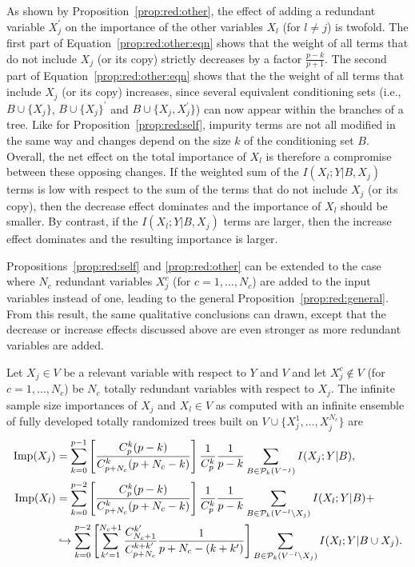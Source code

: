 As shown by Proposition~\ref{prop:red:other}, the effect of adding a redundant
variable $X_j^\prime$ on the importance of the other variables $X_l$ (for
$l\neq j$) is twofold. The first part of Equation~\ref{prop:red:other:eqn}
shows that the weight of all terms that do not include $X_j$ (or its copy)
strictly decreases by a factor $\tfrac{p-k}{p+1}$. The second part of
Equation~\ref{prop:red:other:eqn} shows that the the weight of all terms that
include $X_j$ (or its copy) increases, since several equivalent conditioning
sets (i.e., $B\cup \{X_j\}$, $B\cup \{X_j\}^\prime$ and $B\cup \{X_j,
X_j^\prime\}$) can now appear within the branches of a tree. Like for
Proposition~\ref{prop:red:self}, impurity terms are not all modified in the
same way and changes depend on the size $k$ of the conditioning set $B$.
Overall, the net effect on the total importance of $X_l$ is therefore a
compromise between these opposing changes. If the weighted sum of the
$I(X_l;Y|B,X_j)$ terms is low with respect to the sum of the terms that do not
include $X_j$ (or its copy), then the decrease effect dominates and the
importance of $X_l$ should be smaller. By contrast, if the $I(X_l;Y|B,X_j)$
terms are larger, then the increase effect dominates and the resulting
importance is larger.

Propositions~\ref{prop:red:self} and \ref{prop:red:other} can be extended to
the case where $N_c$ redundant variables $X_j^c$ (for $c=1,\dots,N_c$) are
added to the input variables instead of one, leading to the general
Proposition~\ref{prop:red:general}. From this result, the same qualitative
conclusions can drawn, except that the decrease or increase effects discussed
above are even stronger as more redundant variables are added.

\begin{proposition}\label{prop:red:general}
Let $X_j\in V$ be a relevant variable with respect to $Y$ and $V$ and let
$X_j^c \notin V$ (for $c=1,\dots,N_c$) be $N_c$ totally redundant variables with respect to $X_j$.
The infinite sample size importances of $X_j$ and $X_l \in V$ as computed with an infinite
ensemble of fully developed totally randomized trees built on $V\cup
\{X_j^1,\dots,X_j^{N_c}\}$ are
\begin{align*}
\text{Imp}(X_j)  &= \sum_{k=0}^{p-1} \left[ \frac{C^k_p (p-k)}{C^k_{p+N_c}(p+N_c-k)}  \right] \frac{1}{C_p^k} \frac{1}{p-k} \sum_{B \in {\cal P}_k(V^{-j})} I(X_j;Y|B), \\
\text{Imp}(X_l) &= \sum_{k=0}^{p-2} \left[ \frac{C^k_p (p-k)}{C^k_{p+N_c}(p+N_c-k)}  \right] \frac{1}{C_p^k} \frac{1}{p-k} \sum_{B \in {\cal P}_k(V^{-l} \setminus X_j)} I(X_l;Y|B) + \\
                & \hookrightarrow \sum_{k=0}^{p-2}  \left[ \sum_{k'=1}^{N_c+1} \frac{C^{k'}_{N_c+1}}{C_{p+N_c}^{k+k'}} \frac{1}{p+N_c-(k+k')} \right]  \sum_{B \in {\cal P}_k(V^{-l}\setminus X_j)} I(X_l;Y|B\cup X_j).
\end{align*}
\end{proposition}

